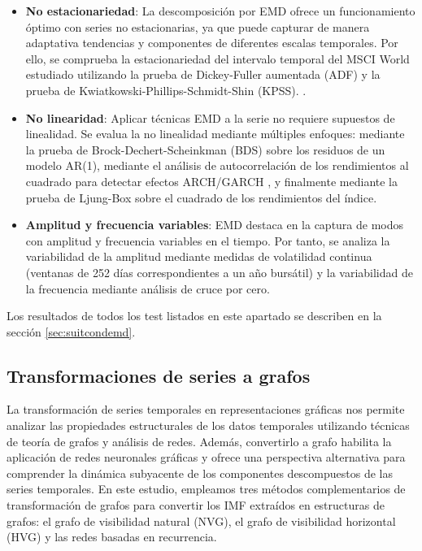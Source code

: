 \documentclass[11pt,a4paper]{article}
\begin{document}
\begin{itemize}
\item \textbf{No estacionariedad}: La descomposición por EMD ofrece un funcionamiento óptimo con series no estacionarias, ya que puede capturar de manera adaptativa tendencias y componentes de diferentes escalas temporales. Por ello, se comprueba la estacionariedad del intervalo temporal del MSCI World estudiado utilizando la prueba de Dickey-Fuller aumentada (ADF) \citep{dickey1979distribution} y la prueba de Kwiatkowski-Phillips-Schmidt-Shin (KPSS). \citep{kwiatkowski1992testing}.

\item \textbf{No linearidad}: Aplicar técnicas EMD a la serie no requiere supuestos de linealidad. Se evalua la no linealidad mediante múltiples enfoques: mediante la prueba de Brock-Dechert-Scheinkman (BDS) \citep{brock1996test} sobre los residuos de un modelo AR(1), mediante el análisis de autocorrelación de los rendimientos al cuadrado para detectar efectos ARCH/GARCH \citep{engle1982autoregressive,bollerslev1986generalized}, y finalmente mediante la prueba de Ljung-Box \citep{ljung1978measure} sobre el cuadrado de los rendimientos del índice.

\item \textbf{Amplitud y frecuencia variables}: EMD destaca en la captura de modos con amplitud y frecuencia variables en el tiempo. Por tanto, se analiza la variabilidad de la amplitud mediante medidas de volatilidad continua (ventanas de 252 días correspondientes a un año bursátil) y la variabilidad de la frecuencia mediante análisis de cruce por cero.
\end{itemize}

Los resultados de todos los test listados en este apartado se describen en la sección \ref{sec:suitcondemd}.

\subsection{Transformaciones de series a grafos}

La transformación de series temporales en representaciones gráficas nos permite analizar las propiedades estructurales de los datos temporales utilizando técnicas de teoría de grafos y análisis de redes. Además, convertirlo a grafo habilita la aplicación de redes neuronales gráficas y ofrece una perspectiva alternativa para comprender la dinámica subyacente de los componentes descompuestos de las series temporales. En este estudio, empleamos tres métodos complementarios de transformación de grafos para convertir los IMF extraídos en estructuras de grafos: el grafo de visibilidad natural (NVG), el grafo de visibilidad horizontal (HVG) y las redes basadas en recurrencia.
\end{document}
